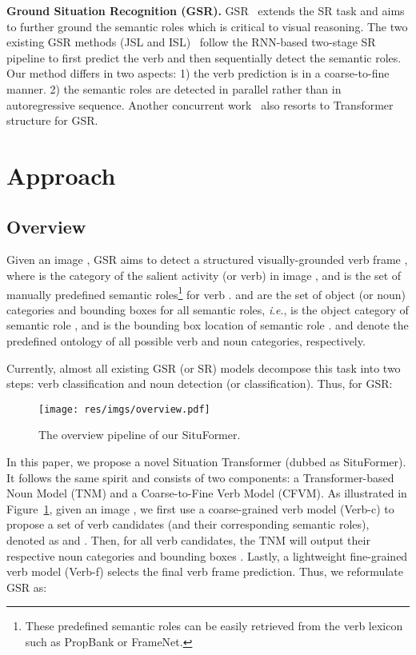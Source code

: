 \documentclass[letterpaper]{article} \usepackage{aaai22}  \usepackage{times}  \usepackage{helvet}  \usepackage{courier}  \usepackage[hyphens]{url}  \usepackage{graphicx} \urlstyle{rm} \def\UrlFont{\rm}  \usepackage{natbib}  \usepackage{caption} \DeclareCaptionStyle{ruled}{labelfont=normalfont,labelsep=colon,strut=off} \frenchspacing  \setlength{\pdfpagewidth}{8.5in}  \setlength{\pdfpageheight}{11in}
\newcommand{\ie}{\textit{i}.\textit{e}.}
\begin{document}
\noindent\textbf{Ground Situation Recognition (GSR).} GSR~\cite{yang2016grounded,silberer2018grounding,pratt2020grounded} extends the SR task and aims to further ground the semantic roles which is critical to visual reasoning. The two existing GSR methods (JSL and ISL)~\cite{pratt2020grounded} follow the RNN-based two-stage SR pipeline to first predict the verb and then sequentially detect the semantic roles.  
Our method differs in two aspects: 1) the verb prediction is in a coarse-to-fine manner. 2) the semantic roles are detected in parallel rather than in autoregressive sequence. Another concurrent work~\cite{cho2021grounded} also resorts to Transformer structure for GSR.










\section{Approach}
\subsection{Overview}
Given an image , GSR aims to detect a structured visually-grounded verb frame , where  is the category of the salient activity (or verb) in image , and  is the set of manually predefined semantic roles\footnote{These predefined semantic roles can be easily retrieved from the verb lexicon such as PropBank or FrameNet.} for verb .  and  are the set of object (or noun) categories and bounding boxes for all semantic roles, \ie,  is the object category of semantic role , and  is the bounding box location of semantic role .  and  denote the predefined ontology of all possible verb and noun categories, respectively.

Currently, almost all existing GSR (or SR) models decompose this task into two steps: verb classification and noun detection (or classification). Thus, for GSR:


\begin{figure}[t]
    \centering
    \texttt{[image: res/imgs/overview.pdf]}
    \caption{The overview pipeline of our SituFormer.}
    \label{fig:overview}
\end{figure}

In this paper, we propose a novel Situation Transformer (dubbed as SituFormer). It follows the same spirit and consists of two components: a Transformer-based Noun Model (TNM) and a Coarse-to-Fine Verb Model (CFVM). As illustrated in Figure~\ref{fig:overview}, given an image , we first use a coarse-grained verb model (Verb-c) to propose a set of verb candidates (and their corresponding semantic roles), denoted as  and . Then, for all verb candidates, the TNM will output their respective noun categories  and bounding boxes . Lastly, a lightweight fine-grained verb model (Verb-f) selects the final verb frame prediction. Thus, we reformulate GSR as:
\end{document}
